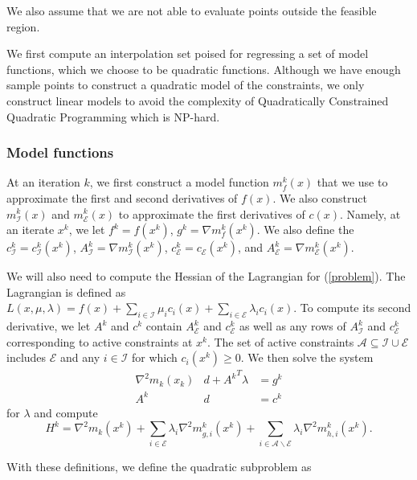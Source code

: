 \documentclass{article}
\let\oldref\ref
\renewcommand{\ref}[1]{(\oldref{#1})}
\begin{document}
We also assume that we are not able to  evaluate points outside the feasible region.

We first compute an interpolation set poised for regressing a set of model functions, which we choose to be quadratic functions.
Although we have enough sample points to construct a quadratic model of the constraints, we only construct linear models to avoid the complexity of Quadratically Constrained Quadratic Programming which is NP-hard.

\subsubsection{Model functions}

At an iteration $k$, we first construct a model function $m_f^k(x)$ that we use to approximate the first and second derivatives of $f(x)$.
We also construct $m_{\mathcal{I}}^k(x)$ and $m_{\mathcal{E}}^k(x)$ to approximate the first derivatives of $c(x)$.
Namely, at an iterate $x^k$, we let $f^k = f(x^k)$, $g^k = \nabla m_f^k(x^k)$. %
We also define the $c_{{\mathcal{I}}}^k = c^k_{\mathcal{I}}(x^k)$, 
$A_{{\mathcal{I}}}^k = \nabla m_{\mathcal{I}}^k(x^k)$,
$c_{{\mathcal{E}}}^k = c_{\mathcal{E}}(x^k)$, and
$A_{{\mathcal{E}}}^k = \nabla m_{\mathcal{E}}^k(x^k)$.

We will also need to compute the Hessian of the Lagrangian for \ref{problem}.
The Lagrangian is defined as 
 $L(x, \mu, \lambda) =
 f(x)  
 + \sum_{i \in {\mathcal{I}}} \mu_i     c_i(x)
 + \sum_{i \in {\mathcal{E}}} \lambda_i c_i(x)$.
To compute its second derivative, we let $A^k$ and $c^k$ contain $A_{\mathcal{E}}^k$ and $c_{\mathcal{E}}^k$ as well as any rows of $A_{{\mathcal{I}}}^k$ and $c_{\mathcal{E}}^k$ corresponding
to active constraints at $x^k$.
The set of active constraints $\mathcal A \subseteq \mathcal I \cup \mathcal E$ includes $\mathcal E$ and any $i \in \mathcal I$ for which $c_i(x^k) \ge 0$.
We then solve the system
\begin{align*}
\nabla^2m_k(x_k) & d + {A^k}^T\lambda & = g^k \\
A^k              & d                & = c^k
\end{align*}
for $\lambda$ and compute
\[
H^k = \nabla^2 m_k(x^k) 
+ \sum_{i \in \mathcal E} \lambda_i \nabla^2 m_{g,i}^k(x^k) 
+ \sum_{i \in \mathcal A \backslash \mathcal E} \lambda_i \nabla^2 m_{h,i}^k(x^k).
\]

With these definitions, we define the quadratic subproblem as
\end{document}
